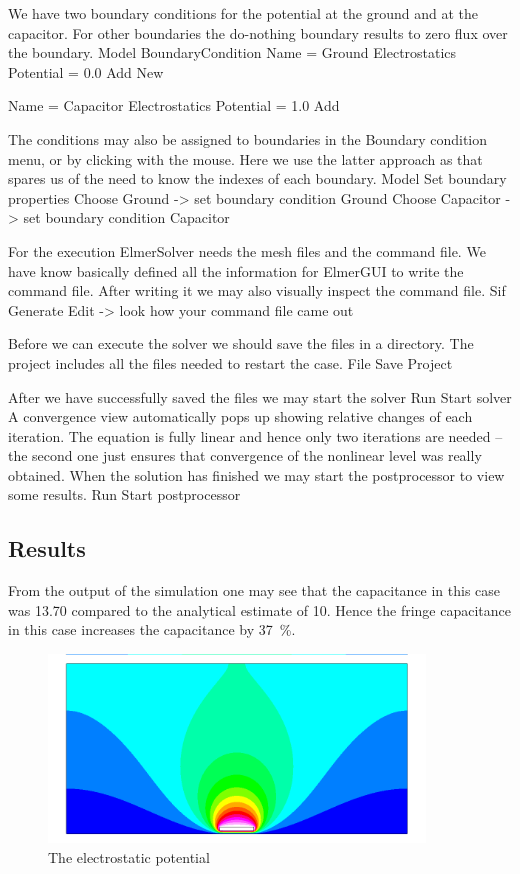 We have two boundary conditions for the potential at the ground and at the capacitor. For other boundaries
the do-nothing boundary results to zero flux over the boundary.
\ttbegin
Model
  BoundaryCondition
    Name = Ground
    Electrostatics
      Potential = 0.0
    Add
    New

    Name = Capacitor
    Electrostatics
      Potential = 1.0
    Add
\ttend   

The conditions may also be assigned to boundaries in the Boundary condition menu, or 
by clicking with the mouse. Here we use the latter approach as that spares us of the 
need to know the indexes of each boundary.
\ttbegin
Model
  Set boundary properties
    Choose Ground -> set boundary condition Ground
    Choose Capacitor -> set boundary condition Capacitor
\ttend


For the execution 
ElmerSolver needs the mesh files and the command file. We have know basically defined
all the information for ElmerGUI to write the command file. After writing it we may also visually 
inspect the command file.
\ttbegin
Sif 
  Generate
  Edit -> look how your command file came out  
\ttend

Before we can execute the solver we should save the files in a directory. The project includes
all the files needed to restart the case.
\ttbegin
File 
  Save Project
\ttend

After we have successfully saved the files we may start the solver
\ttbegin
Run
  Start solver
\ttend
A convergence view automatically pops up showing relative changes of each iteration.
The equation is fully linear and hence only two iterations are needed -- the second 
one just ensures that convergence of the nonlinear level was really obtained. 
When the solution has finished we may start the postprocessor to view some results.
\ttbegin
Run
  Start postprocessor
\ttend


\subsection*{Results}

From the output of the simulation one may see that the 
capacitance in this case was 13.70 compared to the analytical estimate of 10. 
Hence the fringe capacitance in this case increases the capacitance by 37~\%. 

\begin{figure}[h]
\centering
\includegraphics[width=10cm, viewport=0 20 1024 480,clip]{potential}
\caption{The electrostatic potential}\label{fg:es_potential}
\end{figure} 

